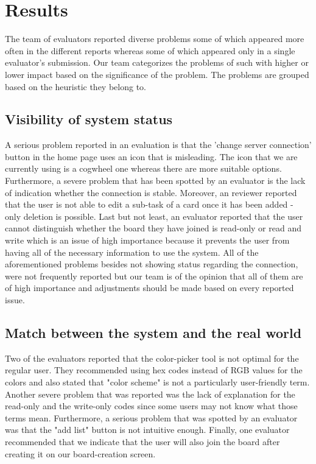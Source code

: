 \section{Results}

The team of evaluators reported diverse problems some of which appeared more often in the different reports whereas some of which appeared only in a single evaluator's submission. Our team categorizes the problems of such with higher or lower impact based on the significance of the problem. The problems are grouped based on the heuristic they belong to. 

\subsection{Visibility of system status}
A serious problem reported in an evaluation is that the 'change server connection' button in the home page uses an icon that is misleading. The icon that we are currently using is a cogwheel one whereas there are more suitable options. Furthermore,  a severe problem that has been spotted by an evaluator is the lack of indication whether the connection is stable. Moreover, an reviewer reported that the user is not able to edit a sub-task of a card once it has been added - only deletion is possible. Last but not least, an evaluator reported that the user cannot distinguish whether the board they have joined is read-only or read and write which is an issue of high importance because it prevents the user from having all of the necessary information to use the system. All of the aforementioned problems besides not showing status regarding the connection, were not frequently reported but our team is of the opinion that all of them are of high importance and adjustments should be made based on every reported issue. 

\subsection{Match between the system and the real world}
Two of the evaluators reported that the color-picker tool is not optimal for the regular user. They recommended using hex codes instead of RGB values for the colors and also stated that "color scheme" is not a particularly user-friendly term. Another severe problem that was reported was the lack of explanation for the read-only and the write-only codes since some users may not know what those terms mean. Furthermore, a serious problem that was spotted by an evaluator was that the "add list" button is not intuitive enough. Finally, one evaluator recommended that we indicate that the user will also join the board after creating it on our board-creation screen.

